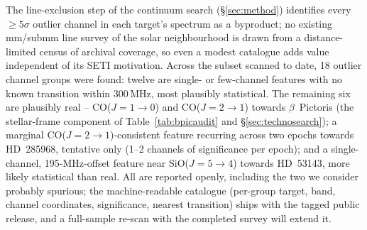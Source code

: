 \documentclass{openjournal}
\begin{document}
The line-exclusion step of the continuum search (\S\ref{sec:method})
identifies every $\geq5\sigma$ outlier channel in each target's
spectrum as a byproduct; no existing mm/submm line survey of the
solar neighbourhood is drawn from a distance-limited census of
archival coverage, so even a modest catalogue adds value independent
of its SETI motivation. Across the subset scanned to date, 18 outlier
channel groups were found: twelve are single- or few-channel features
with no known transition within 300\,MHz, most plausibly statistical.
The remaining six are plausibly real -- CO($J{=}1{\to}0$) and
CO($J{=}2{\to}1$) towards $\beta$~Pictoris (the stellar-frame
component of Table~\ref{tab:bpicaudit} and \S\ref{sec:technosearch});
a marginal CO($J{=}2{\to}1$)-consistent feature recurring across two
epochs towards HD~285968, tentative only (1--2 channels of
significance per epoch); and a single-channel, 195-MHz-offset feature
near SiO($J{=}5{\to}4$) towards HD~53143, more likely statistical than
real. All are reported openly, including the two we consider probably
spurious; the machine-readable catalogue (per-group target, band,
channel coordinates, significance, nearest transition) ships with the
tagged public release, and a full-sample re-scan with the completed
survey will extend it.
\end{document}

